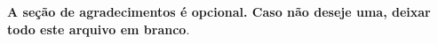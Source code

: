 \begin{agradecimentos}
\textbf{A seção de agradecimentos é opcional. Caso não deseje uma, deixar todo este
	arquivo em branco}.
\end{agradecimentos}